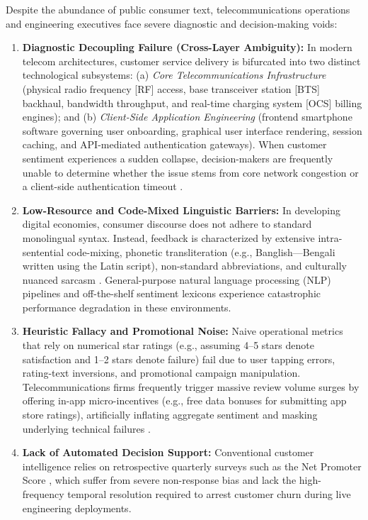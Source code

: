 \documentclass[review,12pt,authoryear]{elsarticle}
\begin{document}
Despite the abundance of public consumer text, telecommunications operations and engineering executives face severe diagnostic and decision-making voids:
\begin{enumerate}
    \item \textbf{Diagnostic Decoupling Failure (Cross-Layer Ambiguity):} In modern telecom architectures, customer service delivery is bifurcated into two distinct technological subsystems: (a) \textit{Core Telecommunications Infrastructure} (physical radio frequency [RF] access, base transceiver station [BTS] backhaul, bandwidth throughput, and real-time charging system [OCS] billing engines); and (b) \textit{Client-Side Application Engineering} (frontend smartphone software governing user onboarding, graphical user interface rendering, session caching, and API-mediated authentication gateways). When customer sentiment experiences a sudden collapse, decision-makers are frequently unable to determine whether the issue stems from core network congestion or a client-side authentication timeout \citep{parasuraman2005esqual, maxham2001service}.
    \item \textbf{Low-Resource and Code-Mixed Linguistic Barriers:} In developing digital economies, consumer discourse does not adhere to standard monolingual syntax. Instead, feedback is characterized by extensive intra-sentential code-mixing, phonetic transliteration (e.g., Banglish---Bengali written using the Latin script), non-standard abbreviations, and culturally nuanced sarcasm \citep{bhattacharjee2022banglabert, rahman2021deep, sazzed2021cross}. General-purpose natural language processing (NLP) pipelines and off-the-shelf sentiment lexicons experience catastrophic performance degradation in these environments.
    \item \textbf{Heuristic Fallacy and Promotional Noise:} Naive operational metrics that rely on numerical star ratings (e.g., assuming 4--5 stars denote satisfaction and 1--2 stars denote failure) fail due to user tapping errors, rating-text inversions, and promotional campaign manipulation. Telecommunications firms frequently trigger massive review volume surges by offering in-app micro-incentives (e.g., free data bonuses for submitting app store ratings), artificially inflating aggregate sentiment and masking underlying technical failures \citep{hu2008overcoming, keiningham2007longitudinal}.
    \item \textbf{Lack of Automated Decision Support:} Conventional customer intelligence relies on retrospective quarterly surveys such as the Net Promoter Score \citep[NPS;][]{reichheld2003one}, which suffer from severe non-response bias and lack the high-frequency temporal resolution required to arrest customer churn during live engineering deployments.
\end{enumerate}
\end{document}
